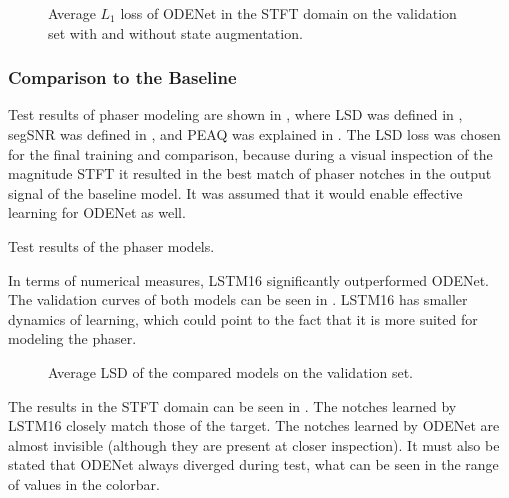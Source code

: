 \begin{figure}
    \centering
    
    \caption{Average $L_1$ loss of ODENet in the \ac{STFT} domain on the validation set with and without state augmentation.}
    \label{fig:state_augmentation}
\end{figure}

\subsubsection{Comparison to the Baseline}

Test results of phaser modeling are shown in , where \ac{LSD} was defined in , \ac{segSNR} was defined in , and \ac{PEAQ} was explained in . The \ac{LSD}  loss was chosen for the final training and comparison, because during a visual inspection of the magnitude \ac{STFT} it resulted in the best match of phaser notches in the output signal of the baseline model. It was assumed that it would enable effective learning for ODENet as well.

\begin{table}[]
    \caption{Test results of the phaser models.}
    \centering
    
    \label{tab:phaser_results}
\end{table}

In terms of numerical measures, \ac{LSTM}16 significantly outperformed ODENet. The validation curves of both models can be seen in . \ac{LSTM}16 has smaller dynamics of learning, which could point to the fact that it is more suited for modeling the phaser.

\begin{figure}
    \centering
    
    \caption{Average \ac{LSD} of the compared models on the validation set.}
    \label{fig:phaser_lstm_vs_fe}
\end{figure}

The results in the \ac{STFT} domain can be seen in . The notches learned by \ac{LSTM}16 closely match those of the target. The notches learned by ODENet are almost invisible (although they are present at closer inspection). It must also be stated that ODENet always diverged during test, what can be seen in the range of values in the colorbar.

